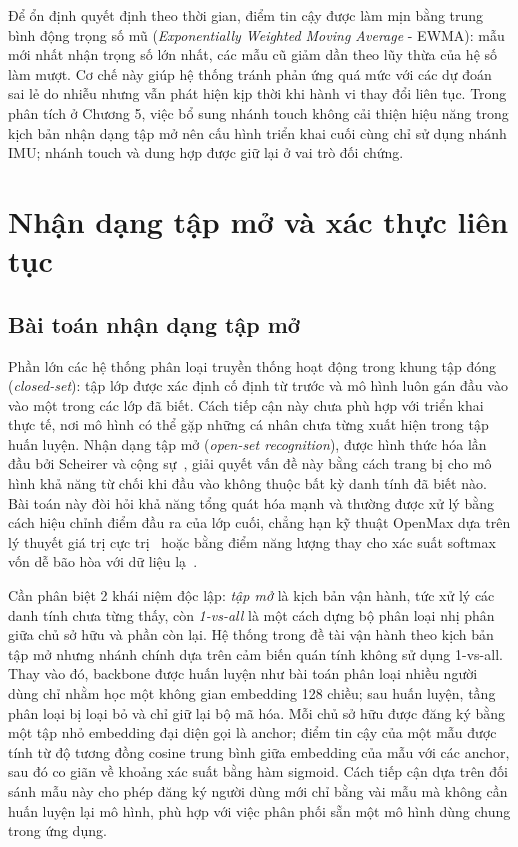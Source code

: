 \documentclass[../DoAn.tex]{subfiles}
\begin{document}
Để ổn định quyết định theo thời gian, điểm tin cậy được làm mịn bằng trung bình động trọng số mũ (\textit{Exponentially Weighted Moving Average} - EWMA): mẫu mới nhất nhận trọng số lớn nhất, các mẫu cũ giảm dần theo lũy thừa của hệ số làm mượt. Cơ chế này giúp hệ thống tránh phản ứng quá mức với các dự đoán sai lẻ do nhiễu nhưng vẫn phát hiện kịp thời khi hành vi thay đổi liên tục. Trong phân tích ở Chương 5, việc bổ sung nhánh touch không cải thiện hiệu năng trong kịch bản nhận dạng tập mở nên cấu hình triển khai cuối cùng chỉ sử dụng nhánh IMU; nhánh touch và dung hợp được giữ lại ở vai trò đối chứng.

\section{Nhận dạng tập mở và xác thực liên tục}
\label{sec:openset}

\subsection{Bài toán nhận dạng tập mở}

Phần lớn các hệ thống phân loại truyền thống hoạt động trong khung tập đóng (\textit{closed-set}): tập lớp được xác định cố định từ trước và mô hình luôn gán đầu vào vào một trong các lớp đã biết. Cách tiếp cận này chưa phù hợp với triển khai thực tế, nơi mô hình có thể gặp những cá nhân chưa từng xuất hiện trong tập huấn luyện. Nhận dạng tập mở (\textit{open-set recognition}), được hình thức hóa lần đầu bởi Scheirer và cộng sự~\cite{scheirer2013openset}, giải quyết vấn đề này bằng cách trang bị cho mô hình khả năng từ chối khi đầu vào không thuộc bất kỳ danh tính đã biết nào. Bài toán này đòi hỏi khả năng tổng quát hóa mạnh và thường được xử lý bằng cách hiệu chỉnh điểm đầu ra của lớp cuối, chẳng hạn kỹ thuật OpenMax dựa trên lý thuyết giá trị cực trị~\cite{bendale2016openmax} hoặc bằng điểm năng lượng thay cho xác suất softmax vốn dễ bão hòa với dữ liệu lạ~\cite{liu2020energy}.

Cần phân biệt 2 khái niệm độc lập: \textit{tập mở} là kịch bản vận hành, tức xử lý các danh tính chưa từng thấy, còn \textit{1-vs-all} là một cách dựng bộ phân loại nhị phân giữa chủ sở hữu và phần còn lại. Hệ thống trong đề tài vận hành theo kịch bản tập mở nhưng nhánh chính dựa trên cảm biến quán tính không sử dụng 1-vs-all. Thay vào đó, backbone được huấn luyện như bài toán phân loại nhiều người dùng chỉ nhằm học một không gian embedding 128 chiều; sau huấn luyện, tầng phân loại bị loại bỏ và chỉ giữ lại bộ mã hóa. Mỗi chủ sở hữu được đăng ký bằng một tập nhỏ embedding đại diện gọi là anchor; điểm tin cậy của một mẫu được tính từ độ tương đồng cosine trung bình giữa embedding của mẫu với các anchor, sau đó co giãn về khoảng xác suất bằng hàm sigmoid. Cách tiếp cận dựa trên đối sánh mẫu này cho phép đăng ký người dùng mới chỉ bằng vài mẫu mà không cần huấn luyện lại mô hình, phù hợp với việc phân phối sẵn một mô hình dùng chung trong ứng dụng.
\end{document}
